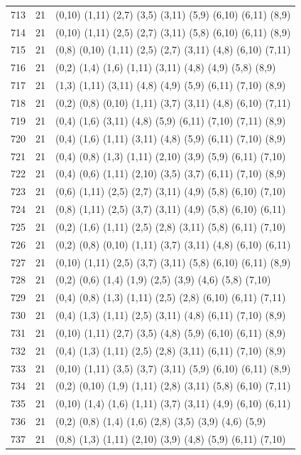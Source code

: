 \begin{appendix}
{\begin{longtable}{lll}
713& 21 & (0,10)  (1,11) (2,7)  (3,5)   (3,11)  (5,9)   (6,10)  (6,11)  (8,9)\\
714& 21 & (0,10)  (1,11) (2,5)  (2,7)   (3,11)  (5,8)   (6,10)  (6,11)  (8,9)\\
715& 21 & (0,8)   (0,10) (1,11) (2,5)   (2,7)   (3,11)  (4,8)   (6,10)  (7,11)\\
716& 21 & (0,2)   (1,4)  (1,6)  (1,11)  (3,11)  (4,8)   (4,9)   (5,8)   (8,9)\\
717& 21 & (1,3)   (1,11) (3,11) (4,8)   (4,9)   (5,9)   (6,11)  (7,10)  (8,9)\\
718& 21 & (0,2)   (0,8)  (0,10) (1,11)  (3,7)   (3,11)  (4,8)   (6,10)  (7,11)\\
719& 21 & (0,4)   (1,6)  (3,11) (4,8)   (5,9)   (6,11)  (7,10)  (7,11)  (8,9)\\
720& 21 & (0,4)   (1,6)  (1,11) (3,11)  (4,8)   (5,9)   (6,11)  (7,10)  (8,9)\\
721& 21 & (0,4)   (0,8)  (1,3)  (1,11)  (2,10)  (3,9)   (5,9)   (6,11)  (7,10)\\
722& 21 & (0,4)   (0,6)  (1,11) (2,10)  (3,5)   (3,7)   (6,11)  (7,10)  (8,9)\\
723& 21 & (0,6)   (1,11) (2,5)  (2,7)   (3,11)  (4,9)   (5,8)   (6,10)  (7,10)\\
724& 21 & (0,8)   (1,11) (2,5)  (3,7)   (3,11)  (4,9)   (5,8)   (6,10)  (6,11)\\
725& 21 & (0,2)   (1,6)  (1,11) (2,5)   (2,8)   (3,11)  (5,8)   (6,11)  (7,10)\\
726& 21 & (0,2)   (0,8)  (0,10) (1,11)  (3,7)   (3,11)  (4,8)   (6,10)  (6,11)\\
727& 21 & (0,10)  (1,11) (2,5)  (3,7)   (3,11)  (5,8)   (6,10)  (6,11)  (8,9)\\
728& 21 & (0,2)   (0,6)  (1,4)  (1,9)   (2,5)   (3,9)   (4,6)   (5,8)   (7,10)\\
729& 21 & (0,4)   (0,8)  (1,3)  (1,11)  (2,5)   (2,8)   (6,10)  (6,11)  (7,11)\\
730& 21 & (0,4)   (1,3)  (1,11) (2,5)   (3,11)  (4,8)   (6,11)  (7,10)  (8,9)\\
731& 21 & (0,10)  (1,11) (2,7)  (3,5)   (4,8)   (5,9)   (6,10)  (6,11)  (8,9)\\
732& 21 & (0,4)   (1,3)  (1,11) (2,5)   (2,8)   (3,11)  (6,11)  (7,10)  (8,9)\\
733& 21 & (0,10)  (1,11) (3,5)  (3,7)   (3,11)  (5,9)   (6,10)  (6,11)  (8,9)\\
734& 21 & (0,2)   (0,10) (1,9)  (1,11)  (2,8)   (3,11)  (5,8)   (6,10)  (7,11)\\
735& 21 & (0,10)  (1,4)  (1,6)  (1,11)  (3,7)   (3,11)  (4,9)   (6,10)  (6,11)\\
736& 21 & (0,2)   (0,8)  (1,4)  (1,6)   (2,8)   (3,5)   (3,9)   (4,6)   (5,9)\\
737& 21 & (0,8)   (1,3)  (1,11) (2,10)  (3,9)   (4,8)   (5,9)   (6,11)  (7,10)\\
\end{longtable}}


\end{appendix}

